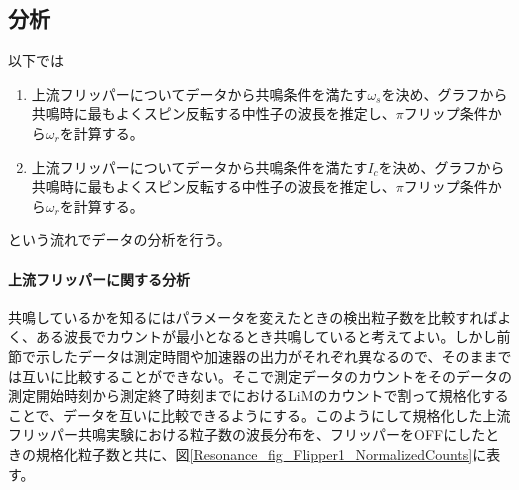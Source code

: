 \clearpage
\subsection{分析}
以下では
\begin{enumerate}
\item 上流フリッパーについてデータから共鳴条件を満たす$\omega_s$を決め、グラフから共鳴時に最もよくスピン反転する中性子の波長を推定し、$\pi$フリップ条件から$\omega_r$を計算する。
\item 上流フリッパーについてデータから共鳴条件を満たす$I_c$を決め、グラフから共鳴時に最もよくスピン反転する中性子の波長を推定し、$\pi$フリップ条件から$\omega_r$を計算する。
\end{enumerate}
という流れでデータの分析を行う。

\paragraph{上流フリッパーに関する分析}
共鳴しているかを知るにはパラメータを変えたときの検出粒子数を比較すればよく、ある波長でカウントが最小となるとき共鳴していると考えてよい。しかし前節で示したデータは測定時間や加速器の出力がそれぞれ異なるので、そのままでは互いに比較することができない。そこで測定データのカウントをそのデータの測定開始時刻から測定終了時刻までにおけるLiMのカウントで割って規格化することで、データを互いに比較できるようにする。このようにして規格化した上流フリッパー共鳴実験における粒子数の波長分布を、フリッパーをOFFにしたときの規格化粒子数と共に、図\ref{Resonance_fig_Flipper1_NormalizedCounts}に表す。

